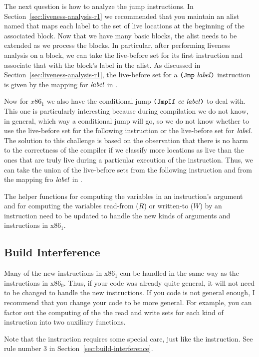 \documentclass[11pt]{book}
\begin{document}
The next question is how to analyze the jump instructions.  In
Section~\ref{sec:liveness-analysis-r1} we recommended that you
maintain an alist named  that maps each label to the
set of live locations at the beginning of the associated block.  Now
that we have many basic blocks, the alist needs to be extended as we
process the blocks. In particular, after performing liveness analysis
on a block, we can take the live-before set for its first instruction
and associate that with the block's label in the alist.
%
As discussed in Section~\ref{sec:liveness-analysis-r1}, the
live-before set for a $\texttt{(Jmp}~\mathit{label}\texttt{)}$ instruction is given by the
mapping for $\mathit{label}$ in .

Now for $x86_1$ we also have the conditional jump
$\texttt{(JmpIf}~\mathit{cc}~\mathit{label}\texttt{)}$ to deal with.  This one is
particularly interesting because during compilation we do not know, in
general, which way a conditional jump will go, so we do not know
whether to use the live-before set for the following instruction or
the live-before set for $\mathit{label}$.  The solution to this challenge
is based on the observation that there is no harm to the correctness
of the compiler if we classify more locations as live than the ones
that are truly live during a particular execution of the
instruction. Thus, we can take the union of the live-before sets from
the following instruction and from the mapping fro $\mathit{label}$ in
.

The helper functions for computing the variables in an instruction's
argument and for computing the variables read-from ($R$) or written-to
($W$) by an instruction need to be updated to handle the new kinds of
arguments and instructions in x86$_1$.

\subsection{Build Interference}
\label{sec:build-interference-r2}

Many of the new instructions in x86$_1$ can be handled in the same way
as the instructions in x86$_0$. Thus, if your code was already quite
general, it will not need to be changed to handle the new
instructions. If you code is not general enough, I recommend that you
change your code to be more general. For example, you can factor out
the computing of the the read and write sets for each kind of
instruction into two auxiliary functions.

Note that the  instruction requires some special care,
just like the  instruction. See rule number 3 in
Section~\ref{sec:build-interference}.
\end{document}
